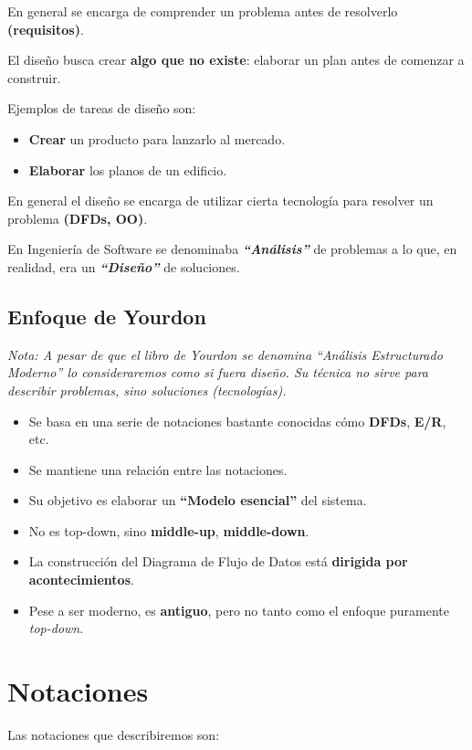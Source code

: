 En general se encarga de comprender un problema antes de resolverlo \textbf{(requisitos)}.

El diseño busca crear \textbf{algo que no existe}: elaborar un plan antes de comenzar a construir.

Ejemplos de tareas de diseño son:

\begin{itemize}[noitemsep]
\item \textbf{Crear} un producto para lanzarlo al mercado.
\item \textbf{Elaborar} los planos de un edificio.
\end{itemize}

En general el diseño se encarga de utilizar cierta tecnología para resolver un problema \textbf{(DFDs, OO)}.

En Ingeniería de Software se denominaba \textit{\textbf{``Análisis''}} de problemas a lo que, en realidad, era un \textit{\textbf{``Diseño''}} de soluciones.

\subsection{Enfoque de Yourdon}
\textit{Nota: A pesar de que el libro de Yourdon se denomina ``Análisis Estructurado Moderno'' lo consideraremos como si fuera diseño. Su técnica no sirve para describir problemas, sino soluciones (tecnologías).}

\begin{itemize}[noitemsep]
\item Se basa en una serie de notaciones bastante conocidas cómo \textbf{DFDs}, \textbf{E/R}, etc.
\item Se mantiene una relación entre las notaciones.
\item Su objetivo es elaborar un \textbf{``Modelo esencial''} del sistema.
\item No es top-down, sino \textbf{middle-up}, \textbf{middle-down}.
\item La construcción del Diagrama de Flujo de Datos está \textbf{dirigida por acontecimientos}.
\item Pese a ser moderno, es \textbf{antiguo}, pero no tanto como el enfoque puramente \textit{top-down}.
\end{itemize}

\section{Notaciones}
Las notaciones que describiremos son:

